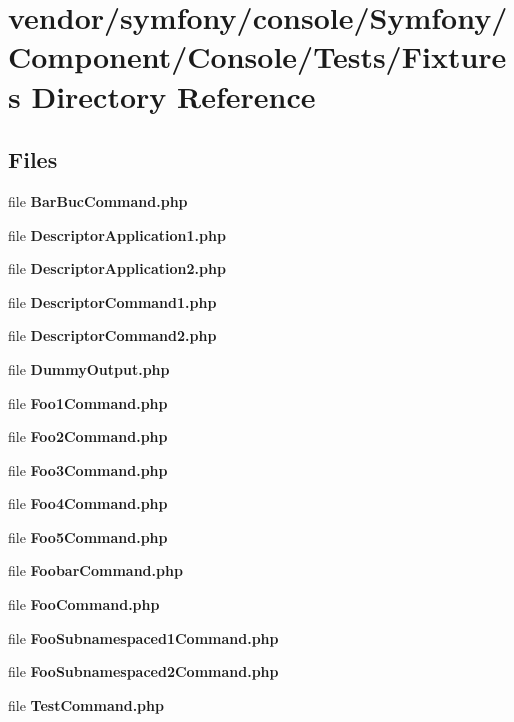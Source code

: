 \section{vendor/symfony/console/\+Symfony/\+Component/\+Console/\+Tests/\+Fixtures Directory Reference}
\label{dir_f625a517f107f11e76886dda5419c603}
\subsection*{Files}
\begin{DoxyCompactItemize}
\item 
file {\bf Bar\+Buc\+Command.\+php}
\item 
file {\bf Descriptor\+Application1.\+php}
\item 
file {\bf Descriptor\+Application2.\+php}
\item 
file {\bf Descriptor\+Command1.\+php}
\item 
file {\bf Descriptor\+Command2.\+php}
\item 
file {\bf Dummy\+Output.\+php}
\item 
file {\bf Foo1\+Command.\+php}
\item 
file {\bf Foo2\+Command.\+php}
\item 
file {\bf Foo3\+Command.\+php}
\item 
file {\bf Foo4\+Command.\+php}
\item 
file {\bf Foo5\+Command.\+php}
\item 
file {\bf Foobar\+Command.\+php}
\item 
file {\bf Foo\+Command.\+php}
\item 
file {\bf Foo\+Subnamespaced1\+Command.\+php}
\item 
file {\bf Foo\+Subnamespaced2\+Command.\+php}
\item 
file {\bf Test\+Command.\+php}
\end{DoxyCompactItemize}
